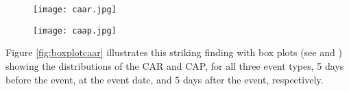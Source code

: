 
\begin{figure*}[h!]
\centering
        \begin{subfigure}{0.49\textwidth}   
            \centering 
            \texttt{[image: caar.jpg]}
        \end{subfigure}
        \begin{subfigure}{0.49\textwidth}   
            \centering 
            \texttt{[image: caap.jpg]}
        \end{subfigure}
        \label{fig:caarcaap}
\end{figure*}



Figure \ref{fig:boxplotcaar} illustrates this striking finding with box plots (see \citet{boxplot1} and \citet{boxplot2}) showing the distributions of the CAR and CAP, for all three event types, 5 days before the event, at the event date, and 5 days after the event, respectively. 

